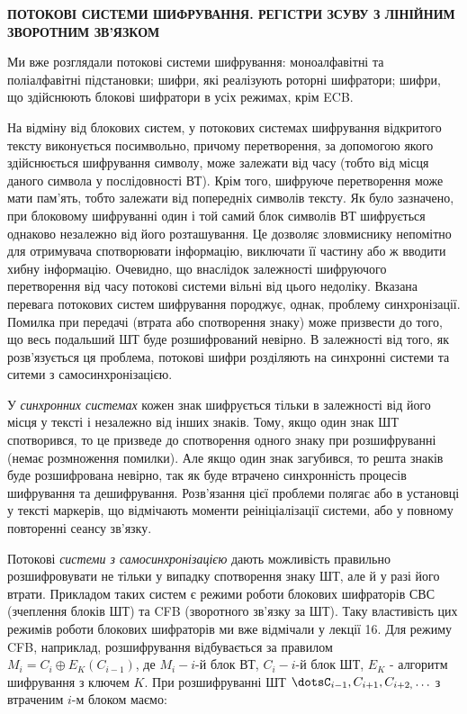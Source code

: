 {\centering\bfseries
ПОТОКОВІ  СИСТЕМИ  ШИФРУВАННЯ.  РЕГІСТРИ ЗСУВУ  З  ЛІНІЙНИМ  ЗВОРОТНИМ  ЗВ’ЯЗКОМ
\par}


\bigskip


\bigskip

Ми вже розглядали потокові системи шифрування: моноалфавітні та поліалфавітні
підстановки; шифри, які реалізують роторні шифратори; шифри, що здійснюють
блокові шифратори в  усіх режимах, крім ECB.

На відміну від блокових систем, у потокових системах шифрування відкритого
тексту виконується посимвольно, причому перетворення, за допомогою якого
здійснюється шифрування символу, може залежати від часу (тобто від місця даного
символа у послідовності ВТ). Крім того, шифруюче перетворення може мати
пам’ять, тобто залежати від попередніх символів тексту. Як було зазначено, при
блоковому шифруванні один і той самий блок символів ВТ шифрується однаково
незалежно від його розташування. Це дозволяє зловмиснику непомітно для
отримувача спотворювати інформацію, виключати її частину або ж вводити хибну
інформацію. Очевидно, що внаслідок залежності шифруючого перетворення від часу
потокові системи вільні від цього недоліку. Вказана перевага потокових систем
шифрування породжує, однак, проблему синхронізації. Помилка при передачі
(втрата або спотворення знаку) може призвести до того, що весь подальший ШТ
буде розшифрований невірно. В залежності від того, як розв’язується ця
проблема, потокові шифри розділяють на синхронні системи та ситеми з
самосинхронізацією.

У \textit{синхронних системах}\textbf{ }кожен знак шифрується тільки в
залежності від його місця у тексті і незалежно від інших знаків. Тому, якщо
один знак ШТ спотворився, то це призведе до спотворення одного знаку при
розшифруванні (немає розмноження помилки). Але якщо один знак загубився, то
решта знаків буде розшифрована невірно, так як буде втрачено синхронність
процесів шифрування та дешифрування. Розв’язання цієї проблеми полягає або в
установці у тексті маркерів, що відмічають моменти реініціалізації системи, або
у повному повторенні сеансу зв’язку.

Потокові \textit{системи з самосинхронізацією} дають можливість правильно
розшифровувати не тільки у випадку спотворення знаку ШТ, але й у разі його
втрати. Прикладом таких систем є режими роботи блокових шифраторів СВС 
(зчеплення блоків ШТ)  та CFB (зворотного зв’язку за ШТ). Таку властивість цих
режимів роботи блокових шифраторів ми вже відмічали у лекції 16. Для режиму
CFB, наприклад, розшифрування відбувається за правилом  
${M_{{i}}=C_{{i}}{\oplus}E_{{K}}(C_{{i-1}})}$, де  ${M_{{i}}-i}${}-й блок ВТ, 
${C_{{i}}-i}${}-й блок ШТ,  ${E_{{K}}}$ \nobreakdash- алгоритм шифрування з
ключем  ${K}$. При розшифруванні ШТ 
${\dotsC_{{i-1}},C_{{i+1}},C_{{i+2,}}\dots}$
 з втраченим   ${i}${}-м блоком маємо:

